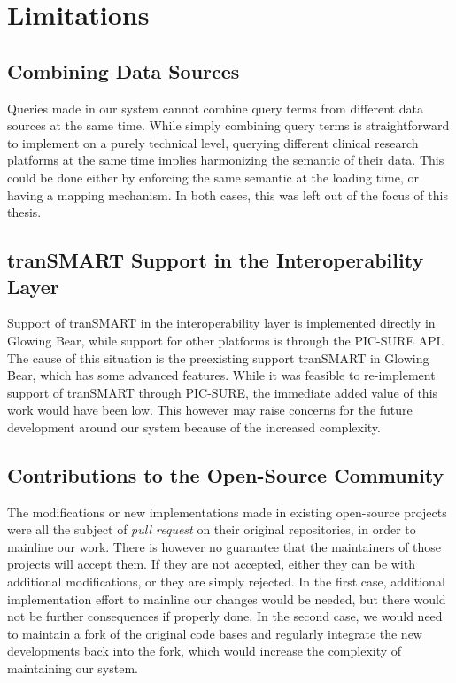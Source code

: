 \section{Limitations}

\subsection{Combining Data Sources}
Queries made in our system cannot combine query terms from different data sources at the same time.
While simply combining query terms is straightforward to implement on a purely technical level, querying different clinical research platforms at the same time implies harmonizing the semantic of their data.
This could be done either by enforcing the same semantic at the loading time, or having a mapping mechanism.
In both cases, this was left out of the focus of this thesis.

\subsection{tranSMART Support in the Interoperability Layer}
Support of tranSMART in the interoperability layer is implemented directly in Glowing Bear, while support for other platforms is through the PIC-SURE API.
The cause of this situation is the preexisting support tranSMART in Glowing Bear, which has some advanced features.
While it was feasible to re-implement support of tranSMART through PIC-SURE, the immediate added value of this work would have been low.
This however may raise concerns for the future development around our system because of the increased complexity.

\subsection{Contributions to the Open-Source Community}
The modifications or new implementations made in existing open-source projects were all the subject of \emph{pull request} on their original repositories, in order to mainline our work.
There is however no guarantee that the maintainers of those projects will accept them.
If they are not accepted, either they can be with additional modifications, or they are simply rejected.
In the first case, additional implementation effort to mainline our changes would be needed, but there would not be further consequences if properly done.
In the second case, we would need to maintain a fork of the original code bases and regularly integrate the new developments back into the fork, which would increase the complexity of maintaining our system.


